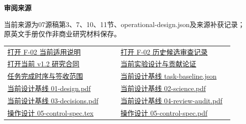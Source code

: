 \documentclass[11pt,a4paper]{article}
\newcommand{\reviewsubsection}[1]{\par\Needspace{4\baselineskip}\vspace{4pt}\begin{center}{\titlelatin\titlecjk\bfseries\fontsize{12}{18}\selectfont #1}\end{center}}
\begin{document}
\begin{minipage}{\linewidth}
\reviewsubsection{3.4 审阅来源}
当前来源为07源稿第3、7、10、11节、operational-\allowbreak{}design.json及来源补获记录；原英文手册仅作非商业研究材料保存。


\begingroup\small\setlength{\tabcolsep}{4pt}\begin{tabular}{@{}p{0.48\linewidth}p{0.48\linewidth}@{}}
\href{file:///D:/Agent/srp/agent/tasks/F-02/outputs/current-measurement.md}{打开 F-\allowbreak{}02 当前适用说明} & \href{file:///D:/Agent/srp/agent/governance/planning/2026-08-05_SRP_IJHCI_\%E5\%85\%A8\%E9\%A1\%B9\%E7\%9B\%AE1-12\%E6\%AD\%A5\%E8\%A7\%84\%E5\%88\%92\%E8\%AE\%BE\%E8\%AE\%A1\%E5\%8C\%85_v1.0/03_\%E6\%AD\%A5\%E9\%AA\%A402_\%E6\%9E\%84\%E5\%BF\%B5\%E6\%AF\%94\%E8\%BE\%83\%E6\%9D\%A1\%E4\%BB\%B6\%E4\%B8\%8E\%E6\%B5\%8B\%E9\%87\%8F/02_F-02_\%E9\%AA\%8C\%E6\%94\%B6\%E8\%AE\%B0\%E5\%BD\%95.md}{打开 F-\allowbreak{}02 历史候选审查记录}\\[4pt]
\href{file:///D:/Agent/srp/agent/governance/planning/2026-08-05_SRP_IJHCI_\%E5\%85\%A8\%E9\%A1\%B9\%E7\%9B\%AE1-12\%E6\%AD\%A5\%E8\%A7\%84\%E5\%88\%92\%E8\%AE\%BE\%E8\%AE\%A1\%E5\%8C\%85_v1.0/00_\%E6\%80\%BB\%E6\%8E\%A7/protocol_authority_v1.2.json}{打开当前 v1.2 研究合同} & \href{file:///D:/Agent/srp/agent/design/\%E7\%A0\%94\%E7\%A9\%B6\%E4\%B8\%BB\%E6\%97\%A8\%E4\%B8\%8E\%E5\%AE\%9E\%E9\%AA\%8C\%E8\%AE\%BE\%E8\%AE\%A1\%E8\%AE\%BA\%E8\%AF\%81_\%E5\%BD\%93\%E5\%89\%8D.md}{当前实验设计与贡献论证}\\[4pt]
\href{file:///D:/Agent/srp/agent/work/2026-10-08_\%E4\%BB\%BB\%E5\%8A\%A1\%E5\%AE\%8C\%E6\%88\%90\%E6\%97\%B6\%E5\%BA\%8F\%E4\%B8\%8E\%E7\%A0\%94\%E7\%A9\%B6\%E4\%B8\%BB\%E6\%97\%A8.md}{任务完成时序与签收范围} & \href{file:///D:/Agent/srp/agent/design/design-foundation-20261008/task-baseline.json}{当前设计基线 task-\allowbreak{}baseline.json}\\[4pt]
\href{file:///D:/Agent/srp/agent/design/design-foundation-20261008/01-design.pdf}{当前设计基线 01-\allowbreak{}design.pdf} & \href{file:///D:/Agent/srp/agent/design/design-foundation-20261008/02-science.pdf}{当前设计基线 02-\allowbreak{}science.pdf}\\[4pt]
\href{file:///D:/Agent/srp/agent/design/design-foundation-20261008/03-decisions.pdf}{当前设计基线 03-\allowbreak{}decisions.pdf} & \href{file:///D:/Agent/srp/agent/design/design-foundation-20261008/04-review-audit.pdf}{当前设计基线 04-\allowbreak{}review-\allowbreak{}audit.pdf}\\[4pt]
\href{file:///D:/Agent/srp/agent/design/design-foundation-20261008/05-control-spec.tex}{操作设计 05-\allowbreak{}control-\allowbreak{}spec.tex} & \href{file:///D:/Agent/srp/agent/design/design-foundation-20261008/05-control-spec.pdf}{操作设计 05-\allowbreak{}control-\allowbreak{}spec.pdf}\\[4pt]

\end{tabular}
\end{minipage}
\end{document}
